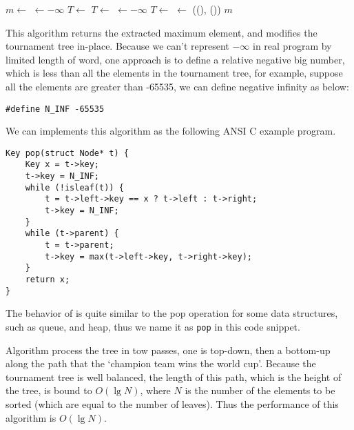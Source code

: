 \documentclass{article}
\begin{document}
\begin{algorithmic}
  \State $m \gets$ 
  \State {} $\gets -\infty$
    
      \State $T \gets$ 
    \Else
      \State $T \gets$ 
    \EndIf
    \State {} $\gets -\infty$
  \EndWhile
   
    \State $T \gets$ 
    \State {} $\gets$ ((), ())
  \EndWhile
  \State \Return $m$
\EndFunction
\end{algorithmic}

This algorithm returns the extracted maximum element, and modifies the tournament tree in-place.
Because we can't represent $-\infty$ in real program by limited length of word, one approach is to define
a relative negative big number, which is less than all the elements in the tournament tree, for example,
suppose all the elements are greater than -65535, we can define negative infinity as below:

\lstset{language=C}
\begin{lstlisting}
#define N_INF -65535
\end{lstlisting}

We can implements this algorithm as the following ANSI C example program.

\lstset{language=C}
\begin{lstlisting}
Key pop(struct Node* t) {
    Key x = t->key;
    t->key = N_INF;
    while (!isleaf(t)) {
        t = t->left->key == x ? t->left : t->right;
        t->key = N_INF;
    }
    while (t->parent) {
        t = t->parent;
        t->key = max(t->left->key, t->right->key);
    }
    return x;
}
\end{lstlisting}

The behavior of  is quite similar to the pop operation for some data structures,
such as queue, and heap, thus we name it as \verb|pop| in this code snippet.

Algorithm  process the tree in tow passes, one is top-down, then a bottom-up along
the path that the `champion team wins the world cup'.
Because the tournament tree is well balanced,
the length of this path, which is the height of the tree, is bound to $O(\lg N)$,
where $N$ is the number of the elements to be sorted (which are equal to the number of leaves).
Thus the performance of this algorithm is $O(\lg N)$.
\end{document}
